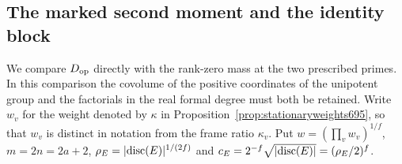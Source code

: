 \documentclass[a4paper,11pt]{article}
\theoremstyle{definition}
\theoremstyle{remark}
\numberwithin{equation}{section}
\begin{document}
\subsection{The marked second moment and the identity block}
\label{sec:markedmoment703}

We compare \(D_{\rm op}\) directly with the rank-zero mass at
the two prescribed primes. In this comparison the covolume of
the positive coordinates of the unipotent group and the
factorials in the real formal degree must both be retained.
Write \(w_v\) for the weight denoted by \(\kappa\) in
Proposition~\ref{prop:stationaryweights695}, so that \(w_v\)
is distinct in notation from the frame ratio \(\kappa_v\).
Put \(w=(\prod_v w_v)^{1/f}\), \(m=2n=2a+2\),
\(\rho_E=|{\rm disc}(E)|^{1/(2f)}\) and
\(c_E=2^{-f}\sqrt{|{\rm disc}(E)|}=(\rho_E/2)^f\).
\end{document}
